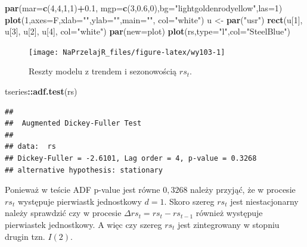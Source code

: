 \documentclass[polish,]{book}
\newenvironment{Shaded}{\begin{snugshade}}{\end{snugshade}}
\newcommand{\DataTypeTok}[1]{\textcolor[rgb]{0.13,0.29,0.53}{#1}}
\newcommand{\DecValTok}[1]{\textcolor[rgb]{0.00,0.00,0.81}{#1}}
\newcommand{\FloatTok}[1]{\textcolor[rgb]{0.00,0.00,0.81}{#1}}
\newcommand{\KeywordTok}[1]{\textcolor[rgb]{0.13,0.29,0.53}{\textbf{#1}}}
\newcommand{\NormalTok}[1]{#1}
\newcommand{\OperatorTok}[1]{\textcolor[rgb]{0.81,0.36,0.00}{\textbf{#1}}}
\newcommand{\StringTok}[1]{\textcolor[rgb]{0.31,0.60,0.02}{#1}}
\begin{document}
\begin{Shaded}
\begin{Highlighting}[]
\KeywordTok{par}\NormalTok{(}\DataTypeTok{mar=}\KeywordTok{c}\NormalTok{(}\DecValTok{4}\NormalTok{,}\DecValTok{4}\NormalTok{,}\DecValTok{1}\NormalTok{,}\DecValTok{1}\NormalTok{)}\OperatorTok{+}\FloatTok{0.1}\NormalTok{, }\DataTypeTok{mgp=}\KeywordTok{c}\NormalTok{(}\DecValTok{3}\NormalTok{,}\FloatTok{0.6}\NormalTok{,}\DecValTok{0}\NormalTok{),}\DataTypeTok{bg=}\StringTok{"lightgoldenrodyellow"}\NormalTok{,}\DataTypeTok{las=}\DecValTok{1}\NormalTok{)}
\KeywordTok{plot}\NormalTok{(}\DecValTok{1}\NormalTok{,}\DataTypeTok{axes=}\NormalTok{F,}\DataTypeTok{xlab=}\StringTok{""}\NormalTok{,}\DataTypeTok{ylab=}\StringTok{""}\NormalTok{,}\DataTypeTok{main=}\StringTok{""}\NormalTok{, }\DataTypeTok{col=}\StringTok{"white"}\NormalTok{)}
\NormalTok{u <-}\StringTok{ }\KeywordTok{par}\NormalTok{(}\StringTok{"usr"}\NormalTok{)}
\KeywordTok{rect}\NormalTok{(u[}\DecValTok{1}\NormalTok{], u[}\DecValTok{3}\NormalTok{], u[}\DecValTok{2}\NormalTok{], u[}\DecValTok{4}\NormalTok{], }\DataTypeTok{col=}\StringTok{"white"}\NormalTok{)}
\KeywordTok{par}\NormalTok{(}\DataTypeTok{new=}\NormalTok{plot)}
\KeywordTok{plot}\NormalTok{(rs,}\DataTypeTok{type=}\StringTok{"l"}\NormalTok{,}\DataTypeTok{col=}\StringTok{"SteelBlue"}\NormalTok{)}
\end{Highlighting}
\end{Shaded}

\begin{figure}[h]

{\centering \texttt{[image: NaPrzelajR\_files/figure-latex/wy103-1]} 

}

\caption{Reszty modelu z trendem i sezonowością $rs_t$.}\label{fig:wy103}
\end{figure}

\begin{Shaded}
\begin{Highlighting}[]
\NormalTok{tseries}\OperatorTok{::}\KeywordTok{adf.test}\NormalTok{(rs)}
\end{Highlighting}
\end{Shaded}

\begin{verbatim}
## 
##  Augmented Dickey-Fuller Test
## 
## data:  rs
## Dickey-Fuller = -2.6101, Lag order = 4, p-value = 0.3268
## alternative hypothesis: stationary
\end{verbatim}

Ponieważ w teście ADF p-value jest równe \(0,3268\) należy przyjąć, że w procesie
\(rs_t\) występuje pierwiastk jednostkowy \(d = 1\). Skoro szereg \(rs_t\) jest niestacjonarny należy sprawdzić czy w procesie \(\Delta rs_t = rs_t - rs_{t-1}\) również występuje pierwiastek jednostkowy. A więc czy szereg
\(rs_t\) jest zintegrowany w stopniu drugin tzn. \(I(2)\).
\end{document}
